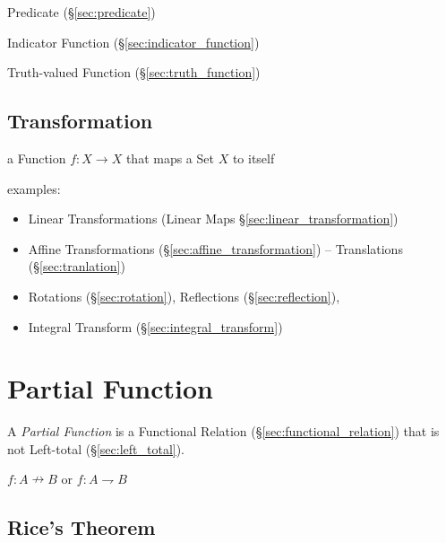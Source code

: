 Predicate (\S\ref{sec:predicate})

Indicator Function (\S\ref{sec:indicator_function})

Truth-valued Function (\S\ref{sec:truth_function})



\subsection{Transformation}\label{sec:transformation}

a Function $f : X \rightarrow X$ that maps a Set $X$ to itself

examples:

\begin{itemize}
  \item Linear Transformations (Linear Maps \S\ref{sec:linear_transformation})
  \item Affine Transformations (\S\ref{sec:affine_transformation}) --
    Translations (\S\ref{sec:tranlation})
  \item Rotations (\S\ref{sec:rotation}), Reflections (\S\ref{sec:reflection}),
  \item Integral Transform (\S\ref{sec:integral_transform})
\end{itemize}



\section{Partial Function}\label{sec:partial_function}

A \emph{Partial Function} is a Functional Relation
(\S\ref{sec:functional_relation}) that is not Left-total
(\S\ref{sec:left_total}).

$f : A \nrightarrow B$ or $f : A \rightharpoondown B$




\subsection{Rice's Theorem}\label{sec:rices_theorem}

